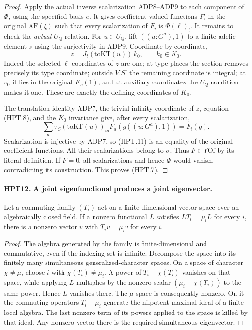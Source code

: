 \begin{proof}
Apply the actual inverse scalarization ADP8--ADP9 to each
component of $\Phi$, using the specified basis $e$.  It gives
coefficient-valued functions $F_i$ in the original $\mathrm{AF}(\xi)$
such that every scalarization of $F_i$ is $\Phi(\ell)_i$.
It remains to check the \emph{actual} $U_Q$ relation.  For
$u\in U_Q$, lift $((u: G^a),1)$ to a finite adelic element $z$
using the surjectivity in ADP9.  Coordinate by coordinate,
\[
                      z=J_t(\mathrm{toKT}(u))\,k_0,
                                      \qquad k_0\in K_0.        \tag{HPT.10}
\]
Indeed the selected $\ell$-coordinates of $z$ are one; at type
places the section removes precisely its type coordinate;
outside $V.S'$ the remaining coordinate is integral; at $v_0$
it lies in the original $K_c(1)$; and at auxiliary coordinates
the $U_Q$ condition makes it one.  These are exactly the
defining coordinates of $K_0$.

The translation identity ADP7, the trivial infinity coordinate
of $z$, equation (HPT.8), and the $K_0$ invariance give, after
every scalarization,
\[
       \sum_a\tau_C(\mathrm{toKT}(u))_{ia}
                     F_a(g((u: G^a),1))=F_i(g).               \tag{HPT.11}
\]
Scalarization is injective by ADP7, so (HPT.11) is an equality
of the original coefficient functions.  All their scalarizations
belong to $\sigma$.  Thus $F\in Y\mathrm{Of}$ by its literal
definition.  If $F=0$, all scalarizations and hence $\Phi$ would
vanish, contradicting its construction.  This proves (HPT.7).
\end{proof}

\paragraph{HPT12. A joint eigenfunctional produces a joint eigenvector.}
\label{claim:HPT12}
Let a commuting family $(T_i)$ act on a finite-dimensional vector
space over an algebraically closed field.  If a nonzero functional
$L$ satisfies $LT_i=\mu_iL$ for every $i$, there is a nonzero vector
$v$ with $T_iv=\mu_iv$ for every $i$.
\begin{proof}
The algebra generated by the family is finite-dimensional and
commutative, even if the indexing set is infinite.  Decompose the
space into its finitely many simultaneous generalized-character
spaces.  On a space of character $\chi\ne\mu$, choose $i$ with
$\chi(T_i)\ne\mu_i$.  A power of $T_i-\chi(T_i)$ vanishes on
that space, while applying $L$ multiplies by the nonzero scalar
$(\mu_i-\chi(T_i))$ to the same power.  Hence $L$ vanishes there.
The $\mu$ space is consequently nonzero.  On it the commuting
operators $T_i-\mu_i$ generate the nilpotent maximal ideal of a
finite local algebra.  The last nonzero term of its powers applied
to the space is killed by that ideal.  Any nonzero vector there
is the required simultaneous eigenvector.
\end{proof}

